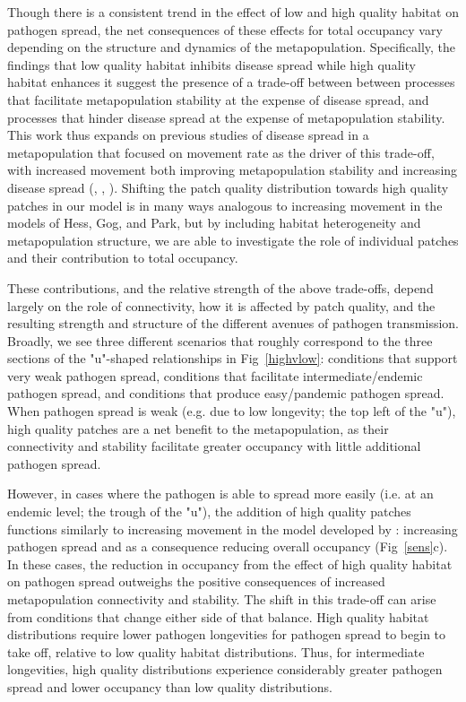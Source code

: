 \documentclass{article}
\begin{document}
Though there is a consistent trend in the effect of low and high quality habitat on pathogen spread, the net consequences of these effects for total occupancy vary depending on the structure and dynamics of the metapopulation.  Specifically, the findings that low quality habitat inhibits disease spread while high quality habitat enhances it suggest the presence of a trade-off between between processes that facilitate metapopulation stability at the expense of disease spread, and processes that hinder disease spread at the expense of metapopulation stability.  This work thus expands on previous studies of disease spread in a metapopulation that focused on movement rate as the driver of this trade-off, with increased movement both improving metapopulation stability and increasing disease spread (\cite{Hess1996}, \cite{Gog2002}, \cite{Park2012}).  Shifting the patch quality distribution towards high quality patches in our model is in many ways analogous to increasing movement in the models of Hess, Gog, and Park, but by including habitat heterogeneity and metapopulation structure, we are able to investigate the role of individual patches and their contribution to total occupancy.

These contributions, and the relative strength of the above trade-offs, depend largely on the role of connectivity, how it is affected by patch quality, and the resulting strength and structure of the different avenues of pathogen transmission.  Broadly, we see three different scenarios that roughly correspond to the three sections of the "u"-shaped relationships in Fig~\ref{highvlow}: conditions that support very weak pathogen spread, conditions that facilitate intermediate/endemic pathogen spread, and conditions that produce easy/pandemic pathogen spread.  When pathogen spread is weak (e.g. due to low longevity; the top left of the "u"), high quality patches are a net benefit to the metapopulation, as their connectivity and stability facilitate greater occupancy with little additional pathogen spread.  

However, in cases where the pathogen is able to spread more easily (i.e. at an endemic level; the trough of the "u"), the addition of high quality patches functions similarly to increasing movement in the model developed by \cite{Hess1996}: increasing pathogen spread and as a consequence reducing overall occupancy (Fig~\ref{sens}c).  In these cases, the reduction in occupancy from the effect of high quality habitat on pathogen spread outweighs the positive consequences of increased metapopulation connectivity and stability.  The shift in this trade-off can arise from conditions that change either side of that balance.  High quality habitat distributions require lower pathogen longevities for pathogen spread to begin to take off, relative to low quality habitat distributions.  Thus, for intermediate longevities, high quality distributions experience considerably greater pathogen spread and lower occupancy than low quality distributions.
\end{document}
